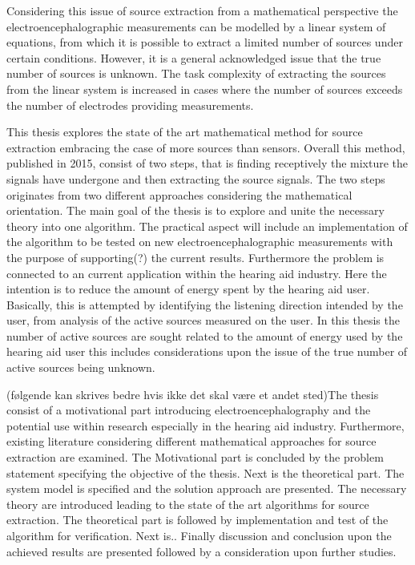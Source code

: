 Considering this issue of source extraction from a mathematical perspective the electroencephalographic measurements can be modelled by a linear system of equations, from which it is possible to extract a limited number of sources under certain conditions. However, it is a general acknowledged issue that the true number of sources is unknown.
The task complexity of extracting the sources from the linear system is increased in cases where the number of sources exceeds the number of electrodes providing measurements.

This thesis explores the state of the art mathematical method for source extraction embracing the case of more sources than sensors. Overall this method, published in 2015, consist of two steps, that is finding receptively the mixture the signals have undergone and then extracting the source signals. The two steps originates from two different approaches considering the mathematical orientation. 
The main goal of the thesis is to explore and unite the necessary theory into one algorithm. The practical aspect will include an implementation of the algorithm to be tested on new electroencephalographic measurements with the purpose of supporting(?) the current results. Furthermore the problem is connected to an current application within the hearing aid industry. Here the intention is to reduce the amount of energy spent by the hearing aid user. Basically, this is attempted by identifying the listening direction intended by the user, from analysis of the active sources measured on the user.
In this thesis the number of active sources are sought related to the amount of energy used by the hearing aid user   
this includes considerations upon the issue of the true number of active sources being unknown. 

(følgende kan skrives bedre hvis ikke det skal være et andet sted)The thesis consist of a motivational part introducing  electroencephalography and the potential use within research especially in the hearing aid industry. Furthermore, existing literature considering different mathematical approaches for source extraction are examined. The Motivational part is concluded by the problem statement specifying the objective of the thesis.
Next is the theoretical part. The system model is specified and the solution approach are presented. The necessary theory are introduced leading to the state of the art algorithms for source extraction.   
The theoretical part is followed by implementation and test of the algorithm for verification. 
Next is..
Finally discussion and conclusion upon the achieved results are presented followed by a consideration upon further studies.    
       
      





              


